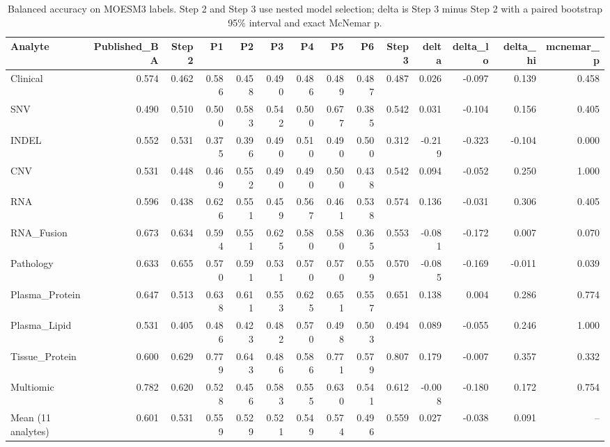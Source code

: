 \begin{table}[t]
\centering
\caption{Balanced accuracy on MOESM3 labels. Step 2 and Step 3 use nested model selection; delta is Step 3 minus Step 2 with a paired bootstrap 95\% interval and exact McNemar p.}
\begin{tabular}{lrrrrrrrrrrrrr}
\hline
Analyte & Published\_BA & Step2 & P1 & P2 & P3 & P4 & P5 & P6 & Step3 & delta & delta\_lo & delta\_hi & mcnemar\_p \\
\hline
Clinical & 0.574 & 0.462 & 0.586 & 0.458 & 0.490 & 0.486 & 0.489 & 0.487 & 0.487 & 0.026 & -0.097 & 0.139 & 0.458 \\
SNV & 0.490 & 0.510 & 0.500 & 0.583 & 0.542 & 0.500 & 0.677 & 0.385 & 0.542 & 0.031 & -0.104 & 0.156 & 0.405 \\
INDEL & 0.552 & 0.531 & 0.375 & 0.396 & 0.490 & 0.510 & 0.490 & 0.500 & 0.312 & -0.219 & -0.323 & -0.104 & 0.000 \\
CNV & 0.531 & 0.448 & 0.469 & 0.552 & 0.490 & 0.490 & 0.500 & 0.438 & 0.542 & 0.094 & -0.052 & 0.250 & 1.000 \\
RNA & 0.596 & 0.438 & 0.626 & 0.551 & 0.459 & 0.567 & 0.461 & 0.538 & 0.574 & 0.136 & -0.031 & 0.306 & 0.405 \\
RNA\_Fusion & 0.673 & 0.634 & 0.594 & 0.551 & 0.625 & 0.580 & 0.580 & 0.365 & 0.553 & -0.081 & -0.172 & 0.007 & 0.070 \\
Pathology & 0.633 & 0.655 & 0.570 & 0.591 & 0.531 & 0.570 & 0.570 & 0.559 & 0.570 & -0.085 & -0.169 & -0.011 & 0.039 \\
Plasma\_Protein & 0.647 & 0.513 & 0.638 & 0.611 & 0.553 & 0.625 & 0.651 & 0.557 & 0.651 & 0.138 & 0.004 & 0.286 & 0.774 \\
Plasma\_Lipid & 0.531 & 0.405 & 0.486 & 0.423 & 0.482 & 0.570 & 0.498 & 0.503 & 0.494 & 0.089 & -0.055 & 0.246 & 1.000 \\
Tissue\_Protein & 0.600 & 0.629 & 0.779 & 0.643 & 0.486 & 0.586 & 0.771 & 0.579 & 0.807 & 0.179 & -0.007 & 0.357 & 0.332 \\
Multiomic & 0.782 & 0.620 & 0.528 & 0.456 & 0.583 & 0.555 & 0.630 & 0.541 & 0.612 & -0.008 & -0.180 & 0.172 & 0.754 \\
Mean (11 analytes) & 0.601 & 0.531 & 0.559 & 0.529 & 0.521 & 0.549 & 0.574 & 0.496 & 0.559 & 0.027 & -0.038 & 0.091 & -- \\
\hline
\end{tabular}
\end{table}

